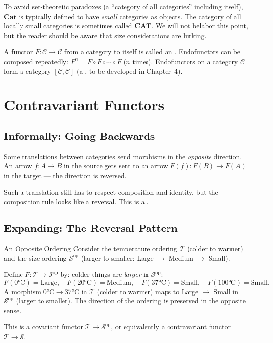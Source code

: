 To avoid set-theoretic paradoxes (a ``category of all categories'' including
itself), $\mathbf{Cat}$ is typically defined to have \emph{small} categories
as objects. The category of all locally small categories is sometimes called
$\mathbf{CAT}$. We will not belabor this point, but the reader should be
aware that size considerations are lurking.

A functor $F : \mathcal{C} \to \mathcal{C}$ from a category to itself is
called an . Endofunctors can be composed repeatedly:
$F^n = F \circ F \circ \cdots \circ F$ ($n$ times). Endofunctors on a
category $\mathcal{C}$ form a category $[\mathcal{C}, \mathcal{C}]$ (a
, to be developed in Chapter~4).


\section{Contravariant Functors}
\label{sec:contravariant}

\subsection{Informally: Going Backwards}

Some translations between categories send morphisms in the \emph{opposite}
direction. An arrow $f : A \to B$ in the source gets sent to an arrow
$F(f) : F(B) \to F(A)$ in the target --- the direction is reversed.

Such a translation still has to respect composition and identity, but the
composition rule looks like a reversal. This is a .

\subsection{Expanding: The Reversal Pattern}

\begin{example}{An Opposite Ordering}
Consider the temperature ordering $\mathcal{T}$ (colder to warmer) and the
size ordering $\mathcal{S}^{\mathrm{op}}$ (larger to smaller: Large $\to$
Medium $\to$ Small).

Define $F : \mathcal{T} \to \mathcal{S}^{\mathrm{op}}$ by: colder things
are \emph{larger} in $\mathcal{S}^{\mathrm{op}}$:
\[
  F(0°\text{C}) = \mathrm{Large},\quad F(20°\text{C}) = \mathrm{Medium},
  \quad F(37°\text{C}) = \mathrm{Small},\quad F(100°\text{C}) = \mathrm{Small}.
\]
A morphism $0°\text{C} \to 37°\text{C}$ in $\mathcal{T}$ (colder to warmer)
maps to Large $\to$ Small in $\mathcal{S}^{\mathrm{op}}$ (larger to smaller).
The direction of the ordering is preserved in the opposite sense.

This is a covariant functor $\mathcal{T} \to \mathcal{S}^{\mathrm{op}}$, or
equivalently a contravariant functor $\mathcal{T} \to \mathcal{S}$.
\end{example}

